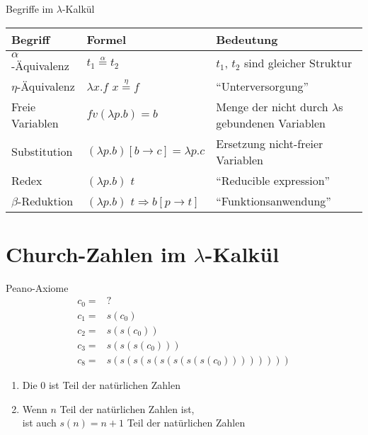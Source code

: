 \documentclass{beamer}
\begin{document}
\newcommand{\aeq}{\stackrel{\alpha}{=}}
\newcommand{\naeq}{\stackrel{\alpha}{\neq}}
\newcommand{\eeq}{\stackrel{\eta}{=}}


\begin{frame}[label=lambdaoverview]{Begriffe im $\lambda$-Kalkül}
	\fontsize{9pt}{13}\selectfont

	\begin{tabularx}{\textwidth}{ s | X | X }
		\textbf{Begriff} & \textbf{Formel} & \textbf{Bedeutung} \\
		\hline
		$\alpha$-Äquivalenz & $t_1 \aeq t_2$ & $t_1$, $t_2$ sind gleicher Struktur \\
		\hline
		$\eta$-Äquivalenz & $\lambda{}x.f$ $x \eeq f$ & \enquote{Unterversorgung} \\
		\hline
		Freie Variablen & $fv(\lambda{}p.b) = { b }$ & Menge der nicht durch $\lambda$s gebundenen Variablen \\
		\hline
		Substitution & $(\lambda{}p.b)\left[b\rightarrow{}c\right]=\lambda{}p.c$ & Ersetzung nicht-freier Variablen \\
		\hline
		Redex & $(\lambda{}p.b)$ $t$ & \enquote{Reducible expression} \\
		\hline
		$\beta$-Reduktion & $(\lambda{}p.b)$ $t \Rightarrow b\left[p\rightarrow{}t\right]$ & \enquote{Funktionsanwendung} \\
	\end{tabularx}
\end{frame}

\section{Church-Zahlen im $\lambda$-Kalkül}

\begin{frame}{Peano-Axiome}
	\begin{eqnarray*}
		c_0 =& ?\\
		c_1 =& s (c_0)\\
		c_2 =& s (s (c_0))\\
		c_3 =& s (s (s (c_0)))\\
		c_8 =& s (s (s (s (s (s (s (s (c_0))))))))
	\end{eqnarray*}

	\begin{enumerate}
		\item Die 0 ist Teil der natürlichen Zahlen
		\item Wenn $n$ Teil der natürlichen Zahlen ist,\\
	 	      ist auch $s(n) = n + 1$ Teil der natürlichen Zahlen
	\end{enumerate}
\end{frame}
\end{document}
